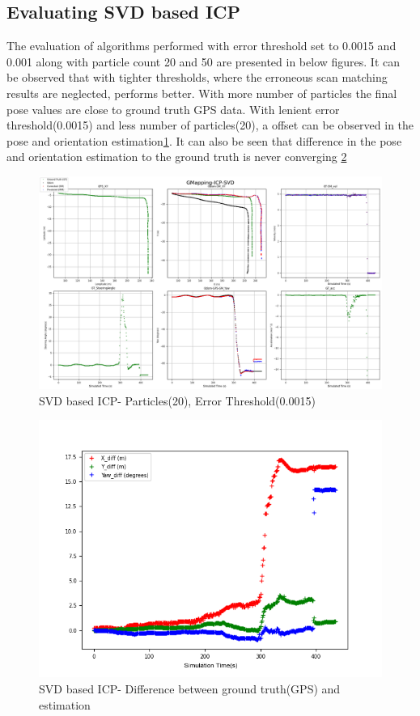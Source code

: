 \subsection{Evaluating SVD based ICP}
The evaluation of algorithms performed with error threshold set to 0.0015 and  0.001 along with particle count 20 and 50 are presented in below figures. It can be observed that with tighter thresholds, where the erroneous scan matching results are neglected, performs better. With more number of particles the final pose values are close to ground truth GPS data.
With lenient error threshold(0.0015) and less number of particles(20), a offset can be observed in the pose and orientation estimation\ref{fig:SVD_20_0.0015}. It can also be seen that difference in the pose and orientation estimation to the ground truth is never converging \ref{fig:SVD_20_0.0015_diff}
    \begin{figure}[h] 
        \includegraphics[height=0.6\textwidth]{images/GMapping-ICP-SVD_Map_20_0.0015.png}
        \caption{SVD based ICP- Particles(20), Error Threshold(0.0015)}
        \label{fig:SVD_20_0.0015}
    \end{figure}
    \begin{figure}[h] 
        \includegraphics[height=0.4\textwidth]{images/GMapping-ICP-SVD_True_vs_Crct_20_0.0015.png}
        \caption{SVD based ICP- Difference between ground truth(GPS) and estimation}
        \label{fig:SVD_20_0.0015_diff}
    \end{figure}
